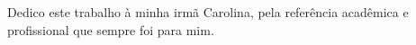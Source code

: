 
\begin{dedicatoria}%

Dedico este trabalho à minha irmã Carolina, pela referência acadêmica e profissional que sempre foi para mim.

\end{dedicatoria}
